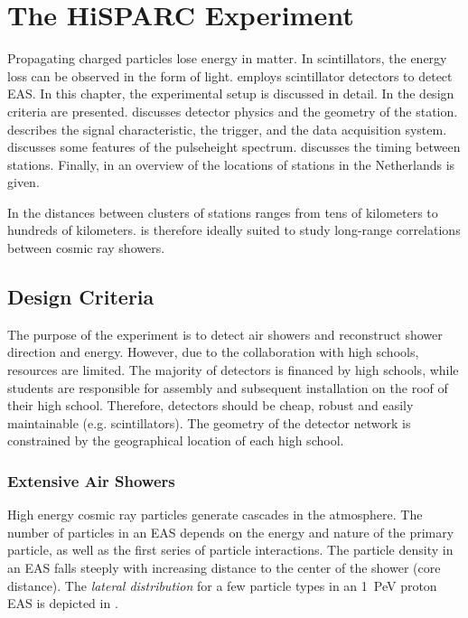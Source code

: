 \chapter{The HiSPARC Experiment}
\label{ch:hisparc-experiment}

Propagating charged particles lose energy in matter. In scintillators, the
energy loss can be observed in the form of light. \hisparc employs scintillator
detectors to detect EAS. In this chapter, the experimental setup is discussed
in detail. In  the design criteria are presented.
 discusses detector physics and the geometry of the
\hisparc station.  describes the signal
characteristic, the trigger, and the data acquisition system.
 discusses some features of
the pulseheight spectrum.  discusses
the timing between stations. Finally, in  an
overview of the \hisparc locations of stations in the Netherlands is given.

In \hisparc the distances between clusters of \hisparc stations ranges from tens
of kilometers to hundreds of kilometers.  \hisparc is therefore ideally suited
to study long-range correlations between cosmic ray showers.


\section{Design Criteria}
\label{sec:design-criteria}

The purpose of the \hisparc experiment is to detect air showers and reconstruct
shower direction and energy.  However, due to the collaboration with high
schools, resources are limited.
The majority of detectors is financed by high schools, while students are
responsible for assembly and subsequent installation on the roof of their high
school.  Therefore, detectors should be cheap, robust and easily
maintainable (e.g.
scintillators).
The geometry of the detector network is constrained by the geographical location
of each high school.


\subsection{Extensive Air Showers}
\label{sec:design-criteria-EAS}

High energy cosmic ray particles generate cascades in the atmosphere. The number
of particles in an EAS depends on the energy and nature of the primary particle,
as well as the first series of particle interactions.
The particle density in an EAS falls steeply with increasing distance to the
center of the shower (core distance). The \emph{lateral distribution} for a few
particle types in an \SI{1}{\peta\electronvolt} proton EAS is depicted in
.

